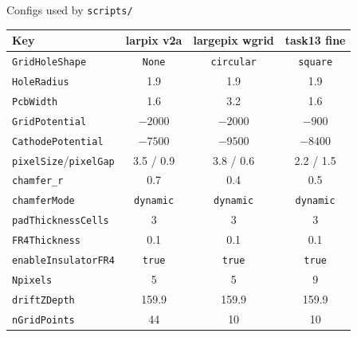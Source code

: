 \documentclass[10pt,aspectratio=169]{beamer}
\newcommand{\ti}[1]{\texttt{\footnotesize #1}}
\begin{document}
\begin{frame}{Configs used by \texttt{scripts/}}
  \small
  \begin{center}
  \begin{tabular}{lccc}
    \toprule
    Key & larpix v2a & largepix wgrid & task13 fine \\
    \midrule
    \ti{GridHoleShape}      & \ti{None}   & \ti{circular} & \ti{square} \\
    \ti{HoleRadius}         & 1.9         & 1.9           & 1.9 \\
    \ti{PcbWidth}           & 1.6         & 3.2           & 1.6 \\
    \ti{GridPotential}      & $-2000$     & $-2000$       & $-900$ \\
    \ti{CathodePotential}   & $-7500$     & $-9500$       & $-8400$ \\
    \ti{pixelSize}/\ti{pixelGap} & 3.5 / 0.9 & 3.8 / 0.6  & 2.2 / 1.5 \\
    \ti{chamfer\_r}         & 0.7         & 0.4           & 0.5 \\
    \ti{chamferMode}        & \ti{dynamic}& \ti{dynamic}  & \ti{dynamic} \\
    \ti{padThicknessCells}  & 3           & 3             & 3 \\
    \ti{FR4Thickness}       & 0.1         & 0.1           & 0.1 \\
    \ti{enableInsulatorFR4} & \ti{true}   & \ti{true}     & \ti{true} \\
    \ti{Npixels}            & 5           & 5             & 9 \\
    \ti{driftZDepth}        & 159.9       & 159.9         & 159.9 \\
    \ti{nGridPoints}        & 44          & 10            & 10 \\
    \bottomrule
  \end{tabular}
  \end{center}
\end{frame}
\end{document}
